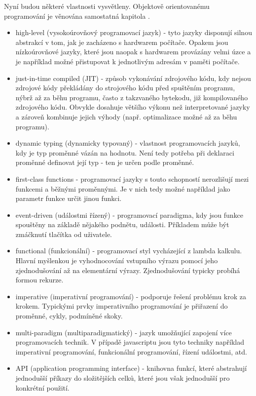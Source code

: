 \documentclass[main.tex]{subfiles}
\begin{document}
Nyní budou některé vlastnosti vysvětleny. Objektově orientovanému programování je věnována samostatná kapitola .
\begin{itemize}
    \item high-level (vysokoúrovňový programovací jazyk) - tyto jazyky disponují silnou abstrakcí v tom, jak je zacházeno s hardwarem počítače. Opakem jsou nízkoúrovňové jazyky, které jsou naopak s hardwarem provázány velmi úzce a je například možné přistupovat k jednotlivým adresám v paměti počítače.
    \item just-in-time compiled (JIT) - způsob vykonávání zdrojového kódu, kdy nejsou zdrojové kódy překládány do strojového kódu před spuštěním programu, nýbrž až za běhu programu, často z takzvaného bytekodu, již kompilovaného zdrojového kódu. Obvykle dosahuje většího výkonu než interpretované jazyky a zároveň kombinuje jejich výhody (např. optimalizace možné až za běhu programu).
    \item dynamic typing (dynamicky typovaný) - vlastnost programovacích jazyků, kdy je typ proměnné vázán na hodnotu. Není tedy potřeba při deklaraci proměnné definovat její typ - ten je určen podle proměnné.
    \item first-class functions - programovací jazyky s touto schopností nerozlišují mezi funkcemi a běžnými proměnnými. Je v nich tedy možné například jako parametr funkce určit jinou funkci.

    \item event-driven (událostmi řízený) - programovací paradigma, kdy jsou funkce spouštěny na základě nějakého podnětu, události. Příkladem může být zmáčknutí tlačítka od uživatele. 
    \item functional (funkcionální) - programovací styl vycházející z lambda kalkulu. Hlavní myšlenkou je vyhodnocování vstupního výrazu pomocí jeho zjednodušování až na elementární výrazy. Zjednodušování typicky probíhá formou rekurze. 
    \item imperative (imperativní programování) - podporuje řešení problému krok za krokem. Typickými prvky imperativního programování je přiřazení do proměnné, cykly, podmíněné skoky.  

    \item multi-paradigm (multiparadigmatický) - jazyk umožňující zapojení více programovacích technik. V případě javascriptu jsou tyto techniky například imperativní programování, funkcionální programování, řízení událostmi, atd. 

    \item API (application programming interface) - knihovna funkcí, které abstrahují jednodušší příkazy do složitějších celků, které jsou však jednodušší pro konkrétní použití. 
	\cite{web:wik:cz:js, web:wik:en:js} 
\end{itemize}
\end{document}
